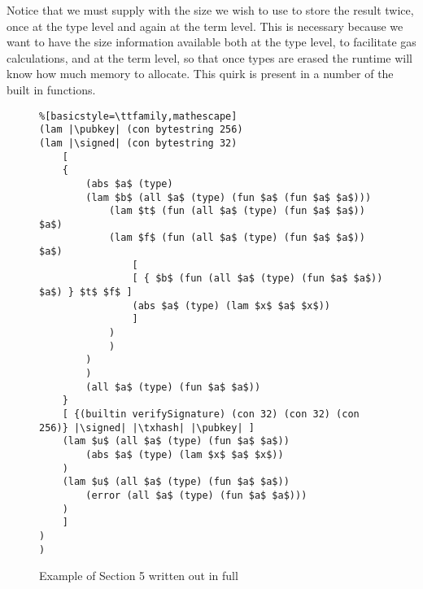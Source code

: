 \documentclass[../plutus-core-specification.tex]{subfiles}
\begin{document}
Notice that we must supply \blocknum{} with the size we wish to use to
store the result twice, once at the type level and again at the term
level. This is necessary because we want to have the size information
available both at the type level, to facilitate gas calculations, and
at the term level, so that once types are erased the runtime will know
how much memory to allocate. This quirk is present in a number of the
built in functions.

\begin{figure*}[h]  %
\begin{lstlisting}%[basicstyle=\ttfamily,mathescape]
(lam |\pubkey| (con bytestring 256)
(lam |\signed| (con bytestring 32)
    [ 
    {
        (abs $a$ (type)
        (lam $b$ (all $a$ (type) (fun $a$ (fun $a$ $a$)))
            (lam $t$ (fun (all $a$ (type) (fun $a$ $a$)) $a$)
            (lam $f$ (fun (all $a$ (type) (fun $a$ $a$)) $a$)
                [
                [ { $b$ (fun (all $a$ (type) (fun $a$ $a$)) $a$) } $t$ $f$ ]
                (abs $a$ (type) (lam $x$ $a$ $x$))
                ]
            )
            )
        )
        )
        (all $a$ (type) (fun $a$ $a$))
    }
    [ {(builtin verifySignature) (con 32) (con 32) (con 256)} |\signed| |\txhash| |\pubkey| ]
    (lam $u$ (all $a$ (type) (fun $a$ $a$))
        (abs $a$ (type) (lam $x$ $a$ $x$))
    )
    (lam $u$ (all $a$ (type) (fun $a$ $a$))
        (error (all $a$ (type) (fun $a$ $a$)))
    )
    ]
)
)
\end{lstlisting}
\caption{Example of Section 5 written out in full}
\label{fig:Continuized_Let_Example}
\end{figure*}
\end{document}
